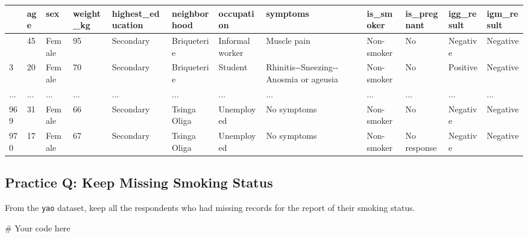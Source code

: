 \documentclass[
  letterpaper,
  DIV=11,
  numbers=noendperiod]{scrreprt}
\newenvironment{Shaded}{\begin{snugshade}}{\end{snugshade}}
\newcommand{\CommentTok}[1]{\textcolor[rgb]{0.37,0.37,0.37}{#1}}
\begin{document}
\begin{longtable}[]{@{}llllllllllll@{}}
\toprule\noalign{}
& age & sex & weight\_kg & highest\_education & neighborhood &
occupation & symptoms & is\_smoker & is\_pregnant & igg\_result &
igm\_result \\
\midrule\noalign{}
\endhead
\bottomrule\noalign{}
\endlastfoot
0 & 45 & Female & 95 & Secondary & Briqueterie & Informal worker &
Muscle pain & Non-smoker & No & Negative & Negative \\
3 & 20 & Female & 70 & Secondary & Briqueterie & Student &
Rhinitis-\/-Sneezing-\/-Anosmia or ageusia & Non-smoker & No & Positive
& Negative \\
... & ... & ... & ... & ... & ... & ... & ... & ... & ... & ... & ... \\
969 & 31 & Female & 66 & Secondary & Tsinga Oliga & Unemployed & No
symptoms & Non-smoker & No & Negative & Negative \\
970 & 17 & Female & 67 & Secondary & Tsinga Oliga & Unemployed & No
symptoms & Non-smoker & No response & Negative & Negative \\
\end{longtable}

\begin{tcolorbox}[enhanced jigsaw, colframe=quarto-callout-tip-color-frame, opacityback=0, titlerule=0mm, bottomrule=.15mm, breakable, leftrule=.75mm, colbacktitle=quarto-callout-tip-color!10!white, title=\textcolor{quarto-callout-tip-color}{\faLightbulb}\hspace{0.5em}{Practice}, rightrule=.15mm, coltitle=black, opacitybacktitle=0.6, colback=white, left=2mm, arc=.35mm, toptitle=1mm, bottomtitle=1mm, toprule=.15mm]

\subsection{Practice Q: Keep Missing Smoking
Status}\label{practice-q-keep-missing-smoking-status}

From the \texttt{yao} dataset, keep all the respondents who had missing
records for the report of their smoking status.

\begin{Shaded}
\begin{Highlighting}[]
\CommentTok{\# Your code here}
\end{Highlighting}
\end{Shaded}

\end{tcolorbox}
\end{document}
